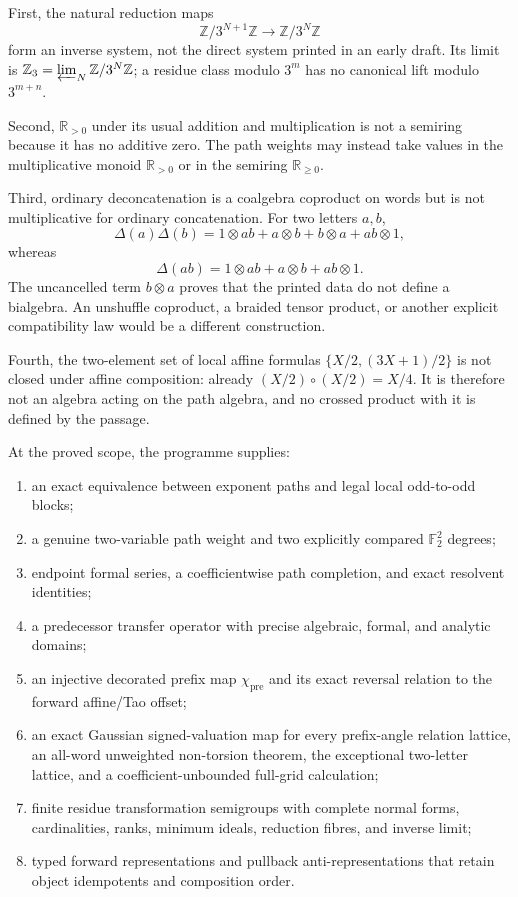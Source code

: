 \begin{sourceissue}
\label{sourceissue:weighted-path-four-type-failures}
First, the natural reduction maps
\[
 \mathbb Z/3^{N+1}\mathbb Z\longrightarrow\mathbb Z/3^N\mathbb Z
\]
form an inverse system, not the direct system printed in an early draft.  Its
limit is $\mathbb Z_3=\varprojlim_N\mathbb Z/3^N\mathbb Z$; a residue class
modulo $3^m$ has no canonical lift modulo $3^{m+n}$.

Second, $\mathbb R_{>0}$ under its usual addition and multiplication is not a
semiring because it has no additive zero.  The path weights may instead take
values in the multiplicative monoid $\mathbb R_{>0}$ or in the semiring
$\mathbb R_{\geq0}$.

Third, ordinary deconcatenation is a coalgebra coproduct on words but is not
multiplicative for ordinary concatenation.  For two letters $a,b$,
\[
 \Delta(a)\Delta(b)
 =1\otimes ab+a\otimes b+b\otimes a+ab\otimes1,
\]
whereas
\[
 \Delta(ab)=1\otimes ab+a\otimes b+ab\otimes1.
\]
The uncancelled term $b\otimes a$ proves that the printed data do not define
a bialgebra.  An unshuffle coproduct, a braided tensor product, or another
explicit compatibility law would be a different construction.

Fourth, the two-element set of local affine formulas
$\{X/2,(3X+1)/2\}$ is not closed under affine composition: already
$(X/2)\circ(X/2)=X/4$.  It is therefore not an algebra acting on the path
algebra, and no crossed product with it is defined by the passage.
\end{sourceissue}

At the proved scope, the programme supplies:
\begin{enumerate}[label=\textup{(\arabic*)}]
\item an exact equivalence between exponent paths and legal local
odd-to-odd blocks;
\item a genuine two-variable path weight and two explicitly compared
$\mathbb F_2^2$ degrees;
\item endpoint formal series, a coefficientwise path completion, and exact
resolvent identities;
\item a predecessor transfer operator with precise algebraic, formal, and
analytic domains;
\item an injective decorated prefix map $\chi_{\mathrm{pre}}$ and its exact
reversal relation to the forward affine/Tao offset;
\item an exact Gaussian signed-valuation map for every prefix-angle relation
lattice, an all-word unweighted non-torsion theorem, the exceptional
two-letter lattice, and a coefficient-unbounded full-grid calculation;
\item finite residue transformation semigroups with complete normal forms,
cardinalities, ranks, minimum ideals, reduction fibres, and inverse limit;
\item typed forward representations and pullback anti-representations that
retain object idempotents and composition order.
\end{enumerate}

